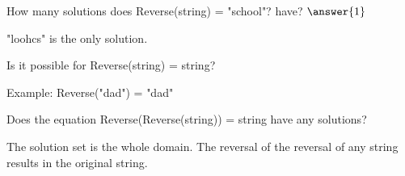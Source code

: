 \documentclass{ximera}
\begin{document}
\begin{exercise}

How many solutions does Reverse(string) = "school"? have? $\answer{1}$


  \begin{feedback}
"loohcs" is the only solution.
  \end{feedback}
\end{exercise}








\begin{exercise}

Is it possible for Reverse(string) = string?

  \begin{multipleChoice}
  \end{multipleChoice}
  \begin{feedback}
Example: Reverse("dad") = "dad"
  \end{feedback}
\end{exercise}


\begin{exercise}

Does the equation Reverse(Reverse(string)) = string have any solutions?

  \begin{multipleChoice}
  \end{multipleChoice}
  \begin{feedback}
The solution set is the whole domain.  The reversal of the reversal of any string results in the original string.
  \end{feedback}
\end{exercise}
\end{document}

